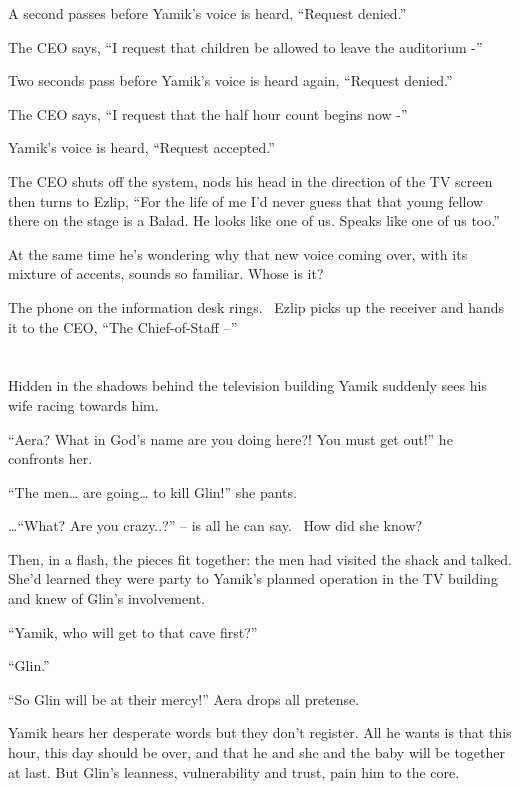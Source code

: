 \documentclass[twoside,11pt]{book}
\begin{document}
A second passes before Yamik's voice is heard, ``Request denied.''

The CEO says, ``I request that children be allowed to leave the auditorium -''

Two seconds pass before Yamik's voice is heard again, ``Request denied.''

The CEO says, ``I request that the half hour count begins now -''

Yamik's voice is heard, ``Request accepted.''

The CEO shuts off the system, nods his head in the direction of the TV screen then turns
to{ }Ezlip, ``For the life of me I'd never guess that that young
fellow there on the stage is a Balad. He looks like one of us. Speaks like one of us too.''

At the same time he's wondering why that new voice coming over,{ }with its
mixture of accents, sounds so familiar. Whose{ }is it?

The phone on the information desk rings. \ Ezlip picks up the receiver and hands it to the CEO, ``The
Chief-of-Staff --''


\bigskip

\chapter{}

Hidden in the shadows behind the television building Yamik suddenly sees his wife racing towards him.

{}``Aera? What in God's name are you doing here?! You must get out!'' he confronts her.

``The men{\dots} are going{\dots} to kill Glin!'' she pants.

{{\dots}}``What?{ }Are you
crazy..?'' -- is all he can say. \ How did she know?

Then, in a flash, the pieces fit together: the men had visited the shack and talked. She'd learned they were party to
Yamik's planned operation in the TV building and knew of Glin's involvement.

``Yamik, who will get to that cave first?''

``Glin.''

``So Glin will be at their mercy!'' Aera drops all pretense.

Yamik hears her desperate words but they don't register. All he wants is that this hour, this day should be over, and
that he and she and the baby will be together at last. But Glin's leanness, vulnerability and trust, pain him to the
core{.}
\end{document}
